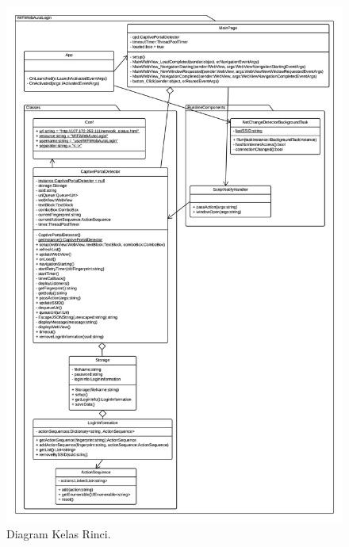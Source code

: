 \begin{figure}[!htb]
    \centering
    \includegraphics[scale=0.63]{Gambar/DetailedClassDiagram.png}
    \caption[Diagram Kelas Rinci.]{Diagram Kelas Rinci.} 
    \label{fig:DetailedClassDiagram}
\end{figure}

